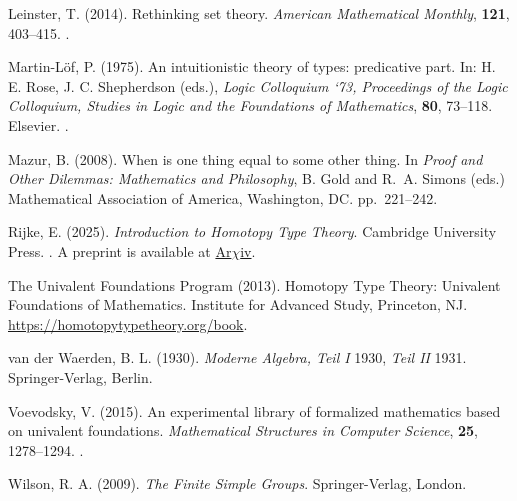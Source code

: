 \documentclass[11pt]{article}
\begin{document}
\begin{thebibliography}{}
Leinster, T. (2014).
\newblock Rethinking set theory.
\newblock \emph{American Mathematical Monthly}, \textbf{121}, 403--415.
\newblock {}.

Martin-L\"{o}f, P. (1975).
\newblock An intuitionistic theory of types: predicative part.
\newblock In: H. E. Rose, J. C. Shepherdson (eds.),
    \emph{Logic Colloquium ‘73, Proceedings of the Logic Colloquium,
    Studies in Logic and the Foundations of Mathematics}, \textbf{80}, 73--118.
\newblock Elsevier.
\newblock {}.

Mazur, B. (2008).
\newblock When is one thing equal to some other thing.
\newblock In \emph{Proof and Other Dilemmas: Mathematics and Philosophy},
B. Gold and R.~A. Simons (eds.)
\newblock Mathematical Association of America, Washington, DC.
\newblock pp.~221--242.

Rijke, E. (2025).
\newblock \emph{Introduction to Homotopy Type Theory}.
\newblock Cambridge University Press.
\newblock {}.
\newblock A preprint is available at
    \href{https://arxiv.org/abs/2212.11082}{Ar$\chi$iv}.

The Univalent Foundations Program (2013).
\newblock Homotopy Type Theory: Univalent Foundations of Mathematics.
\newblock Institute for Advanced Study, Princeton, NJ.
\newblock \url{https://homotopytypetheory.org/book}.

van der Waerden, B. L. (1930).
\newblock \emph{Moderne Algebra, Teil I} 1930, \emph{Teil II} 1931.
\newblock Springer-Verlag, Berlin.

Voevodsky, V. (2015).
\newblock An experimental library of formalized mathematics based on
    univalent foundations.
\newblock \emph{Mathematical Structures in Computer Science}, \textbf{25},
    1278--1294.
\newblock {}.

Wilson, R. A. (2009).
\newblock \emph{The Finite Simple Groups}.
\newblock Springer-Verlag, London.

\end{thebibliography}
\end{document}
